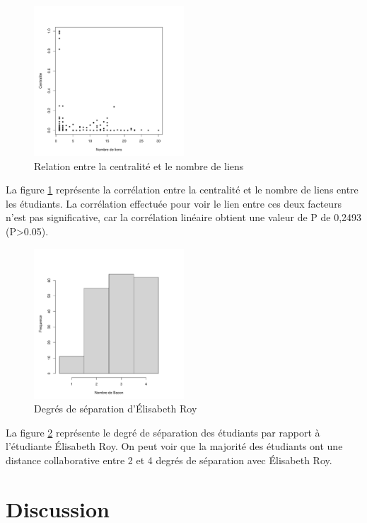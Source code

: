 \documentclass[9pt,twocolumn,twoside,]{pnas-new}
\begin{document}
\begin{figure}
\centering
\includegraphics[width=0.5\textwidth,height=0.4\textheight]{../results/centralite.pdf}
\caption{Relation entre la centralité et le nombre de liens
\label{fig:plot2}}
\end{figure}

La figure \ref{fig:plot2} représente la corrélation entre la centralité
et le nombre de liens entre les étudiants. La corrélation effectuée pour
voir le lien entre ces deux facteurs n'est pas significative, car la
corrélation linéaire obtient une valeur de P de 0,2493
(P\textgreater0.05).

\begin{figure}
\centering
\includegraphics[width=0.5\textwidth,height=0.4\textheight]{../results/bacon.pdf}
\caption{Degrés de séparation d'Élisabeth Roy \label{fig:plot3}}
\end{figure}

La figure \ref{fig:plot3} représente le degré de séparation des
étudiants par rapport à l'étudiante Élisabeth Roy. On peut voir que la
majorité des étudiants ont une distance collaborative entre 2 et 4
degrés de séparation avec Élisabeth Roy.

\hypertarget{discussion}{%
\section{Discussion}\label{discussion}}
\end{document}
